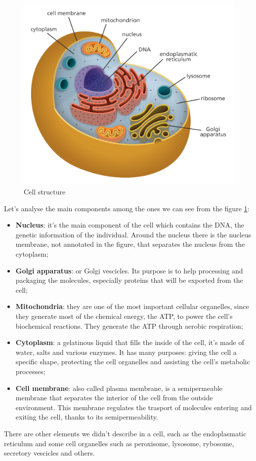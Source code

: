 \begin{figure}[h!]
	\includegraphics[scale=.25]{res/proteins_overview/cell_structure.png}
	\centering
	\caption{Cell structure}
	\label{fig:cell-structure}
\end{figure}

Let's analyse the main components among the ones we can see from the figure \ref{fig:cell-structure}:
\begin{itemize}
	\item \textbf{Nucleus}: it's the main component of the cell which contains the DNA, the genetic information of the individual. Around the nucleus there is the nucleus membrane, not annotated in the figure, that separates the nucleus from the cytoplasm;
	\item \textbf{Golgi apparatus}: or Golgi vescicles. Its purpose is to help processing and packaging the molecules, especially proteins that will be exported from the cell;
	\item  \textbf{Mitochondria}: they are one of the most important cellular organelles, since they generate most of the chemical energy, the ATP, to power the cell's biochemical reactions. They generate the ATP through aerobic respiration;
	\item \textbf{Cytoplasm}: a gelatinous liquid that fills the inside of the cell, it's made of water, salts and various enzymes. It has many purposes: giving the cell a specific shape, protecting the cell organelles and assisting the cell's metabolic processes;
	\item \textbf{Cell membrane}: also called plasma membrane, is a semipermeable membrane that separates the interior of the cell from the outside environment. This membrane regulates the trasport of molecules entering and exiting the cell, thanks to its semipermeability.
\end{itemize}
There are other elements we didn't describe in a cell, such as the endoplasmatic reticulum and some cell organelles such as peroxisome, lysosome, rybosome, secretory vescicles and others.
